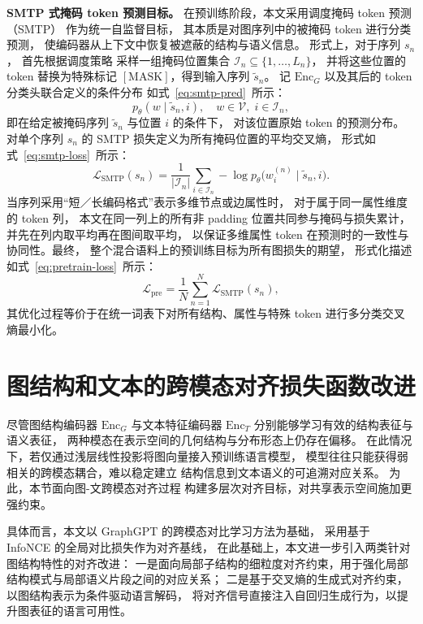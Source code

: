 \textbf{SMTP 式掩码 token 预测目标。}
在预训练阶段，本文采用调度掩码 token 预测（SMTP）
作为统一自监督目标，
其本质是对图序列中的被掩码 token 进行分类预测，
使编码器从上下文中恢复被遮蔽的结构与语义信息。
形式上，对于序列 $s_n$，
首先根据调度策略
采样一组掩码位置集合 $\mathcal{I}_n \subseteq \{1,\dots,L_n\}$，
并将这些位置的 token 替换为特殊标记 $[\mathrm{MASK}]$，得到输入序列
$\tilde{s}_n$。
记 $\mathrm{Enc}_G$ 以及其后的 token 分类头联合定义的条件分布
如式~\ref{eq:smtp-pred}\  所示：
\begin{equation}
  p_\theta(w \mid \tilde{s}_n, i),
  \quad w \in \mathcal{V},\; i \in \mathcal{I}_n,
  \label{eq:smtp-pred}
\end{equation}
即在给定被掩码序列 $\tilde{s}_n$ 与位置 $i$ 的条件下，
对该位置原始 token 的预测分布。
对单个序列 $s_n$ 的 SMTP 损失定义为所有掩码位置的平均交叉熵，
形式如式~\ref{eq:smtp-loss}\  所示：
\begin{equation}
  \mathcal{L}_{\mathrm{SMTP}}(s_n)
  = \frac{1}{|\mathcal{I}_n|}
    \sum_{i \in \mathcal{I}_n}
    - \log p_\theta\big(w^{(n)}_i \mid \tilde{s}_n, i\big).
    \label{eq:smtp-loss}
\end{equation}
当序列采用“短／长编码格式”表示多维节点或边属性时，
对于属于同一属性维度的 token 列，
本文在同一列上的所有非 padding 位置共同参与掩码与损失累计，
并先在列内取平均再在图间取平均，
以保证多维属性 token 在预测时的一致性与协同性。最终，
整个混合语料上的预训练目标为所有图损失的期望，
形式化描述如式~\ref{eq:pretrain-loss}\  所示：
\begin{equation}
  \mathcal{L}_{\mathrm{pre}}
  = \frac{1}{N}
    \sum_{n=1}^{N}
    \mathcal{L}_{\mathrm{SMTP}}(s_n),
    \label{eq:pretrain-loss}
\end{equation}
其优化过程等价于在统一词表下对所有结构、属性与特殊 token
进行多分类交叉熵最小化。

\section{图结构和文本的跨模态对齐损失函数改进}
\label{sec:multi_loss_enhanced}

尽管图结构编码器 $\mathrm{Enc}_G$ 与文本特征编码器 $\mathrm{Enc}_T$
分别能够学习有效的结构表征与语义表征，
两种模态在表示空间的几何结构与分布形态上仍存在偏移。
在此情况下，若仅通过浅层线性投影将图向量接入预训练语言模型，
模型往往只能获得弱相关的跨模态耦合，难以稳定建立
结构信息到文本语义的可追溯对应关系。
为此，本节面向图-文跨模态对齐过程
构建多层次对齐目标，对共享表示空间施加更强约束。

具体而言，本文以 GraphGPT\cite{Tang2023GraphGPTGI} 的跨模态对比学习方法为基础，
采用基于 InfoNCE 的全局对比损失作为对齐基线，
在此基础上，本文进一步引入两类针对图结构特性的对齐改进：
一是面向局部子结构的细粒度对齐约束，用于强化局部结构模式与局部语义片段之间的对应关系；
二是基于交叉熵的生成式对齐约束，以图结构表示为条件驱动语言解码，
将对齐信号直接注入自回归生成行为，以提升图表征的语言可用性。

